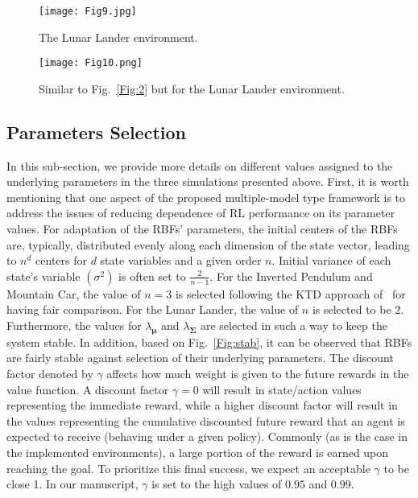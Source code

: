 \documentclass{ieeeaccess}
\def\Sig{\bm{\Sigma}}
\begin{document}
\begin{figure}[t!]
\centering
\texttt{[image: Fig9.jpg]}
\caption{\small{The Lunar Lander environment.}}\label{Fig:8}
\end{figure}
\begin{figure}[t!]
\centering
\texttt{[image: Fig10.png]}
\caption{\small{Similar to Fig.~\ref{Fig:2} but for the Lunar Lander environment.}}\label{Fig:9}
\end{figure}
\subsection{Parameters Selection}  \label{sec:parameter_selection}
\vspace{.1in}
\noindent
In this sub-section, we provide more details on different values assigned to the underlying parameters in the three simulations presented above. First, it is worth mentioning that one aspect of the proposed multiple-model type framework is to address the issues of reducing dependence of RL performance on its parameter values. For adaptation of the RBFs' parameters, the initial centers of the RBFs are, typically, distributed evenly along each dimension of the state vector, leading to $n^d$ centers for $d$ state variables and a given order $n$. Initial variance of each state's variable $(\sigma^2)$ is often set to $\frac{2}{n-1}$. For the Inverted Pendulum and Mountain Car, the value of $n = 3$ is selected following the KTD approach of~\cite{23} for having fair comparison. For the Lunar Lander, the value of $n$ is selected to be $2$. Furthermore, the values for $\lambda_{\bm{\mu}}$ and $\lambda_{\Sig}$ are selected in such a way to keep the system stable. In addition, based on Fig.~\ref{Fig:stab}, it can be observed that RBFs are fairly stable against selection of their underlying parameters. The discount factor denoted by $\gamma$ affects how much weight is given to the future rewards in the value function. A discount factor $\gamma=0$ will result in state/action values representing the immediate reward, while a higher discount factor will result in the values representing the cumulative discounted future reward that an agent is expected to receive (behaving under a given policy). Commonly (as is the case in the  implemented environments), a large portion of the reward is earned upon reaching the goal. To prioritize this final success, we expect an acceptable $\gamma$ to be close 1. In our manuscript, $\gamma$ is set to the high values of $0.95$ and $0.99$.
\end{document}
